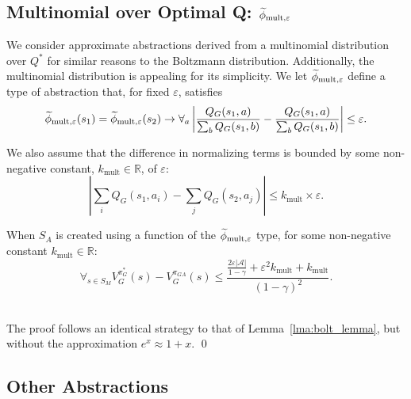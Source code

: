 \subsection{Multinomial over Optimal Q: $\epMu$}
\label{sec:mult}

We consider approximate abstractions derived from a multinomial distribution over $Q^*$ for similar reasons to the Boltzmann distribution. Additionally, the multinomial distribution is appealing for its simplicity.
\bdefn{$\epMu$}
We let $\epMu$ define a type of abstraction that, for fixed $\varepsilon$, satisfies
\begin{equation}
\widetilde \phi_{\text{mult},\varepsilon}(s_1) = \widetilde \phi_{\text{mult},\varepsilon}(s_2) \rightarrow \forall_{a} \left|\frac{Q_G(s_1,a)}{\sum_b Q_G(s_1,b)} - \frac{Q_G(s_1,a)}{\sum_b Q_G(s_1,b)}\right| \leq \varepsilon.
\end{equation}
\edefn

We also assume that the difference in normalizing terms is bounded by some non-negative constant, $k_{\text{mult}} \in \mathbb{R}$, of $\varepsilon$:
\begin{equation}
\left |\sum_i Q_G(s_1,a_i) - \sum_j Q_G(s_2,a_j) \right | \leq k_{\text{mult}} \times \varepsilon.
\end{equation}
\begin{lma} When $S_A$ is created using a function of the $\epMu$ type, for some non-negative constant $k_{\text{mult}} \in \mathbb{R}$:
\begin{equation}
\forall_{s \in S_M} V_G^{\pi^*_G}(s) - V_G^{\pi_{GA}}(s) \leq \frac{\frac{2\varepsilon|\mathcal{A}|}{1-\gamma} + \varepsilon^2 k_{\text{mult}} + k_{\text{mult}}}{(1-\gamma)^2}.
\end{equation}
\label{lma:mult_lemma}
\end{lma}
\vspace{-7mm}%
 \\

\noindent The proof follows an identical strategy to that of Lemma~\ref{lma:bolt_lemma}, but without the approximation $e^x \approx 1+x$. \qed


\subsection{Other Abstractions}
%
%
%

